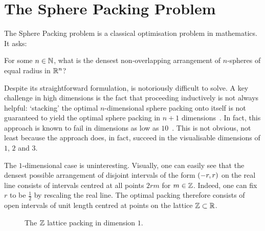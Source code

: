 \section{The Sphere Packing Problem}\label{Ch1:Sec:1_1_Sphere_Packing}

The Sphere Packing problem is a classical optimisation problem in mathematics. It asks:

\begin{boxproblem}\label{Ch1:Prob:SpherePacking_n}
    For some $n \in \mathbb{N}$, what is the densest non-overlapping arrangement of $n$-spheres of equal radius in $\mathbb{R}^n$?
\end{boxproblem}

Despite its straightforward formulation,  is notoriously difficult to solve. A key challenge in high dimensions is the fact that proceeding inductively is not always helpful: `stacking' the optimal $n$-dimensional sphere packing onto itself is not guaranteed to yield the optimal sphere packing in $n + 1$ dimensions~\cite{CohnOnViazovskaICM}. In fact, this approach is known to fail in dimensions as low as $10$~\cite{CohnOnViazovskaAMS}. This is not obvious, not least because the approach does, in fact, succeed in the visualisable dimensions of $1$, $2$ and $3$.

The $1$-dimensional case is uninteresting. Visually, one can easily see that the densest possible arrangement of disjoint intervals of the form $\left( -r, r \right)$ on the real line consists of intervals centred at all points $2rm$ for $m \in \mathbb{Z}$. Indeed, one can fix $r$ to be $\frac{1}{2}$ by rescaling the real line. The optimal packing therefore consists of open intervals of unit length centred at points on the lattice $\mathbb{Z} \subset \mathbb{R}$.

\begin{figure}[htb]
    \centering
    \caption{The $\mathbb{Z}$ lattice packing in dimension $1$.}
    \label{Ch1:Fig:Z_Lattice_Packing_1D}
\end{figure}

